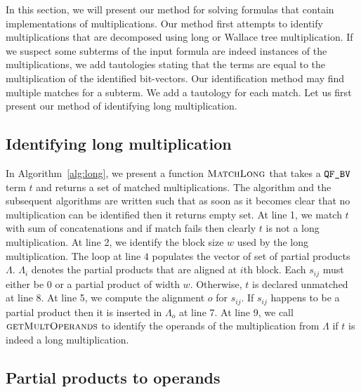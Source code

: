 %
In this section, we will present our method for solving
formulas that contain implementations of multiplications.
%
Our method first attempts to identify multiplications that
are decomposed using long or Wallace tree multiplication.
%
If we suspect some subterms of the input formula
are indeed instances of the
multiplications, we add tautologies stating that the terms are 
equal to the multiplication of the identified bit-vectors.
%
Our identification method may find multiple matches for a subterm.
%
We add a tautology for each match.
%
Let us first present our method of identifying long multiplication. 


\subsection{Identifying long multiplication}


In Algorithm~\ref{alg:long}, we present a function $\textsc{MatchLong}$
that takes a $\texttt{QF\_BV}$ term $t$ and returns a set of matched multiplications.
%
The algorithm and the subsequent algorithms are written such that as soon
as it becomes clear that no multiplication can be identified then
it returns empty set. 
%
At line 1, we match $t$ with sum of concatenations and if match fails
then clearly $t$ is not a long multiplication.
%
At line 2, we identify the block size $w$ used by the long
multiplication.
%
The loop at line $4$ populates the vector of set of partial products $\Lambda$.
%
$\Lambda_i$ denotes the partial products that are aligned at $i$th block.
%
Each $s_{ij}$ must either be $0$ or a partial product of width $w$.
%
Otherwise, $t$ is declared unmatched at line 8. 
%
At line 5, we compute the alignment $o$ for $s_{ij}$.
%
If $s_{ij}$ happens to be a partial product then it is inserted in
$\Lambda_o$ at line 7.
%
At line 9, we call $\textsc{getMultOperands}$ to identify the operands
of the multiplication from $\Lambda$ if $t$ is indeed a long
multiplication.

\subsection{Partial products to operands}



